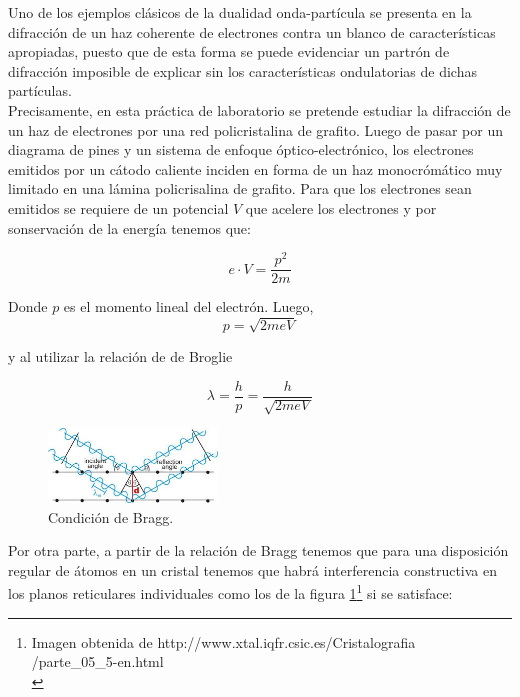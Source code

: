 \documentclass[prb,aps,twocolumn,preprintnumbers,amsmath,amssymb]{revtex4}
\begin{document}
Uno de los ejemplos clásicos de la dualidad onda-partícula se presenta en la difracción de un haz coherente de electrones contra un blanco de características apropiadas, puesto que de esta forma se puede evidenciar un partrón de difracción imposible de explicar sin los características ondulatorias de dichas partículas.\\

Precisamente, en esta práctica de laboratorio se pretende estudiar la difracción de un haz de electrones por una red policristalina de grafito. Luego de pasar por un diagrama de pines y un sistema de enfoque óptico-electrónico, los electrones emitidos por un cátodo caliente inciden en forma de un haz monocrómático muy limitado en una lámina policrisalina de grafito. Para que los electrones sean emitidos se requiere de un potencial $V$ que acelere los electrones y por sonservación de la energía tenemos que:
 
\begin{equation}
\label{conservation}
e \cdot V = \frac{p^{2}}{2m}
\end{equation}

Donde $p$ es el momento lineal del electrón. Luego,\\

\begin{equation}
\label{momento}
p = \sqrt{2meV}
\end{equation}

y al utilizar la relación de de Broglie

\begin{equation}
\label{broglie}
\lambda = \frac{h}{p} = \frac{h}{\sqrt{2meV}}
\end{equation}

\begin{figure}[h!]
	\centering
	\includegraphics[width=0.4\textwidth]{bragg}
	\caption{ Condición de Bragg. }
	\label{fig: bragg}
\end{figure}

Por otra parte, a partir de la relación de Bragg tenemos que para una disposición regular de átomos en un cristal tenemos que habrá interferencia constructiva en los planos reticulares individuales como los de la figura \ref{fig: bragg}\footnote{Imagen obtenida de http://www.xtal.iqfr.csic.es/Cristalografia\\/parte\_05\_5-en.html\\} si se satisface:
\end{document}
